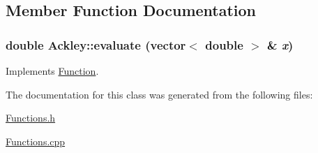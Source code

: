 \subsection{Member Function Documentation}
\hypertarget{classAckley_6423fcd54b72322f08357879bac580b6}{
\subsubsection{\setlength{\rightskip}{0pt plus 5cm}double Ackley::evaluate (vector$<$ double $>$ \& {\em x})}}
\label{classAckley_6423fcd54b72322f08357879bac580b6}




Implements \hyperlink{classFunction_9323a7309b16e0e168590e34b359ff32}{Function}.

The documentation for this class was generated from the following files:\begin{CompactItemize}
\item 
\hyperlink{Functions_8h}{Functions.h}\item 
\hyperlink{Functions_8cpp}{Functions.cpp}\end{CompactItemize}
